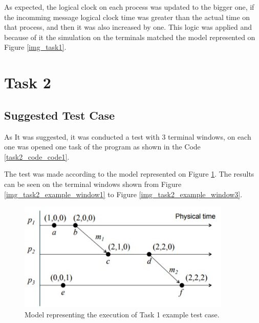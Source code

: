 \documentclass[a4paper, 11pt]{article}
\begin{document}
As expected, the logical clock on each process was updated to the bigger one, if the incomming message logical clock time was greater than the actual time on that process, and then it was also increased by one. This logic was applied and because of it the simulation on the terminals matched the model represented on Figure \ref{img_task1}.

\section*{Task 2}

\subsection*{Suggested Test Case}

As It was suggested, it was conducted a test with 3 terminal windows, on each one was opened one task of the program as shown in the Code \ref{task2_code_code1}.

The test was made according to the model represented on Figure \ref{task2_example_model}. The results can be seen on the terminal windows shown from Figure \ref{img_task2_example_window1} to Figure \ref{img_task2_example_window3}.

\begin{figure}[h]
  \begin{center}
  \includegraphics[width=4in]{./imgs/task2_example_model.jpeg}
  \caption{Model representing the execution of Task 1 example test case.}
  \label{task2_example_model}
  \end{center}
\end{figure}


\end{document}
